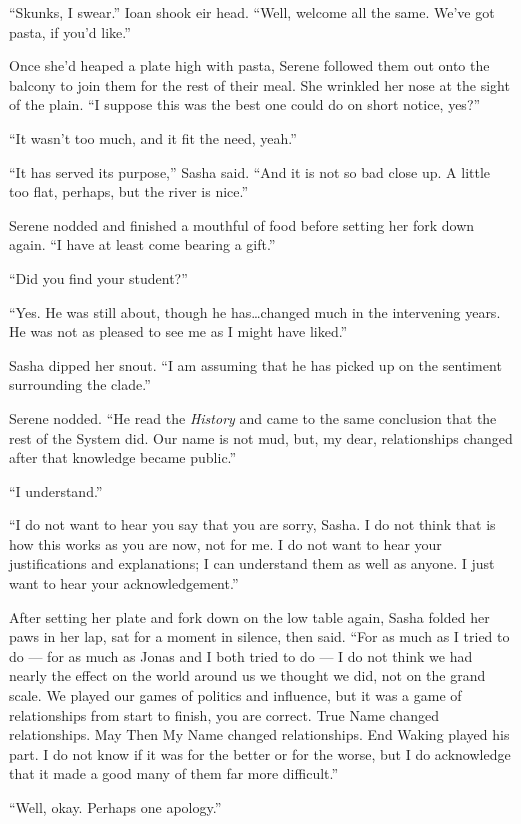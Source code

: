 ``Skunks, I swear.'' Ioan shook eir head. ``Well, welcome all the same. We've got pasta, if you'd like.''

Once she'd heaped a plate high with pasta, Serene followed them out onto the balcony to join them for the rest of their meal. She wrinkled her nose at the sight of the plain. ``I suppose this was the best one could do on short notice, yes?''

``It wasn't too much, and it fit the need, yeah.''

``It has served its purpose,'' Sasha said. ``And it is not so bad close up. A little too flat, perhaps, but the river is nice.''

Serene nodded and finished a mouthful of food before setting her fork down again. ``I have at least come bearing a gift.''

``Did you find your student?''

``Yes. He was still about, though he has\ldots changed much in the intervening years. He was not as pleased to see me as I might have liked.''

Sasha dipped her snout. ``I am assuming that he has picked up on the sentiment surrounding the clade.''

Serene nodded. ``He read the \emph{History} and came to the same conclusion that the rest of the System did. Our name is not mud, but, my dear, relationships changed after that knowledge became public.''

``I understand.''

``I do not want to hear you say that you are sorry, Sasha. I do not think that is how this works as you are now, not for me. I do not want to hear your justifications and explanations; I can understand them as well as anyone. I just want to hear your acknowledgement.''

After setting her plate and fork down on the low table again, Sasha folded her paws in her lap, sat for a moment in silence, then said. ``For as much as I tried to do — for as much as Jonas and I both tried to do — I do not think we had nearly the effect on the world around us we thought we did, not on the grand scale. We played our games of politics and influence, but it was a game of relationships from start to finish, you are correct. True Name changed relationships. May Then My Name changed relationships. End Waking played his part. I do not know if it was for the better or for the worse, but I do acknowledge that it made a good many of them far more difficult.''

``Well, okay. Perhaps one apology.''

